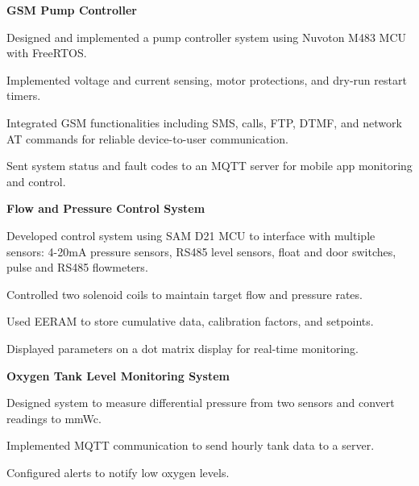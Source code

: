 

\begin{cventries}

\cventry
    {\textbf{GSM Pump Controller}} %
    {} %
    {} %
    {} %
    {
      \begin{cvitems}
        \item {Designed and implemented a pump controller system using Nuvoton M483 MCU with FreeRTOS.}
        \item {Implemented voltage and current sensing, motor protections, and dry-run restart timers.}
        \item {Integrated GSM functionalities including SMS, calls, FTP, DTMF, and network AT commands for reliable device-to-user communication.}
        \item {Sent system status and fault codes to an MQTT server for mobile app monitoring and control.}
      \end{cvitems}
    }

\cventry
    {\textbf{Flow and Pressure Control System}} 
    {} 
    {} 
    {} 
    {
      \begin{cvitems}
        \item {Developed control system using SAM D21 MCU to interface with multiple sensors: 4-20mA pressure sensors, RS485 level sensors, float and door switches, pulse and RS485 flowmeters.}
        \item {Controlled two solenoid coils to maintain target flow and pressure rates.}
        \item {Used EERAM to store cumulative data, calibration factors, and setpoints.}
        \item {Displayed parameters on a dot matrix display for real-time monitoring.}
      \end{cvitems}
    }

\cventry
    {\textbf{Oxygen Tank Level Monitoring System}} 
    {} 
    {} 
    {} 
    {
      \begin{cvitems}
        \item {Designed system to measure differential pressure from two sensors and convert readings to mmWc.}
        \item {Implemented MQTT communication to send hourly tank data to a server.}
        \item {Configured alerts to notify low oxygen levels.}
      \end{cvitems}
    }


\end{cventries}
